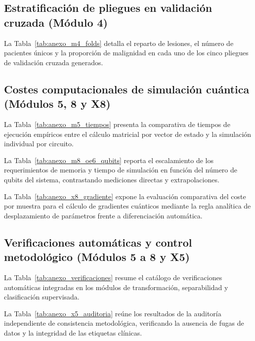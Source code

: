 

\subsection{Estratificación de pliegues en validación cruzada (Módulo 4)}

La Tabla~\ref{tab:anexo_m4_folds} detalla el reparto de lesiones, el número de pacientes únicos y
la proporción de malignidad en cada uno de los cinco pliegues de validación cruzada generados.



\subsection{Costes computacionales de simulación cuántica (Módulos 5, 8 y X8)}

La Tabla~\ref{tab:anexo_m5_tiempos} presenta la comparativa de tiempos de ejecución empíricos entre
el cálculo matricial por vector de estado y la simulación individual por circuito.



La Tabla~\ref{tab:anexo_m8_oe6_qubits} reporta el escalamiento de los requerimientos de memoria y tiempo
de simulación en función del número de qubits del sistema, contrastando mediciones directas y extrapolaciones.



La Tabla~\ref{tab:anexo_x8_gradiente} expone la evaluación comparativa del coste por muestra para el
cálculo de gradientes cuánticos mediante la regla analítica de desplazamiento de parámetros frente a diferenciación automática.



\subsection{Verificaciones automáticas y control metodológico (Módulos 5 a 8 y X5)}

La Tabla~\ref{tab:anexo_verificaciones} resume el catálogo de verificaciones automáticas integradas
en los módulos de transformación, separabilidad y clasificación supervisada.



La Tabla~\ref{tab:anexo_x5_auditoria} reúne los resultados de la auditoría independiente de consistencia
metodológica, verificando la ausencia de fugas de datos y la integridad de las etiquetas clínicas.


